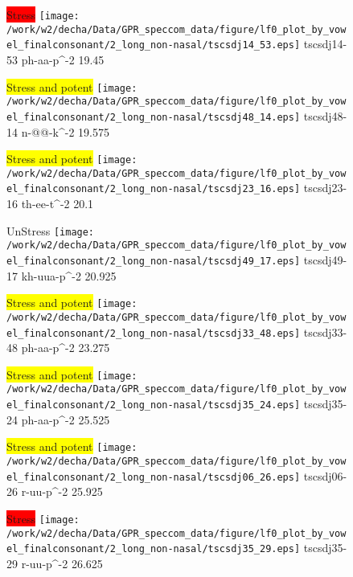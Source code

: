 \documentclass{article}
\begin{document}
\begin{figure}[t]
\begin{minipage}[b]{.24\textwidth}
\colorbox{red}{Stress}
\centering
\texttt{[image: /work/w2/decha/Data/GPR\_speccom\_data/figure/lf0\_plot\_by\_vowel\_finalconsonant/2\_long\_non-nasal/tscsdj14\_53.eps]}
tscsdj14-53 ph-aa-p\textasciicircum-2 19.45
\end{minipage}
\begin{minipage}[b]{.24\textwidth}
\colorbox{yellow}{Stress and potent}
\centering
\texttt{[image: /work/w2/decha/Data/GPR\_speccom\_data/figure/lf0\_plot\_by\_vowel\_finalconsonant/2\_long\_non-nasal/tscsdj48\_14.eps]}
tscsdj48-14 n-@@-k\textasciicircum-2 19.575
\end{minipage}
\begin{minipage}[b]{.24\textwidth}
\colorbox{yellow}{Stress and potent}
\centering
\texttt{[image: /work/w2/decha/Data/GPR\_speccom\_data/figure/lf0\_plot\_by\_vowel\_finalconsonant/2\_long\_non-nasal/tscsdj23\_16.eps]}
tscsdj23-16 th-ee-t\textasciicircum-2 20.1
\end{minipage}
\begin{minipage}[b]{.24\textwidth}
UnStress
\centering
\texttt{[image: /work/w2/decha/Data/GPR\_speccom\_data/figure/lf0\_plot\_by\_vowel\_finalconsonant/2\_long\_non-nasal/tscsdj49\_17.eps]}
tscsdj49-17 kh-uua-p\textasciicircum-2 20.925
\end{minipage}
\end{figure}

\begin{figure}[t]
\begin{minipage}[b]{.24\textwidth}
\colorbox{yellow}{Stress and potent}
\centering
\texttt{[image: /work/w2/decha/Data/GPR\_speccom\_data/figure/lf0\_plot\_by\_vowel\_finalconsonant/2\_long\_non-nasal/tscsdj33\_48.eps]}
tscsdj33-48 ph-aa-p\textasciicircum-2 23.275
\end{minipage}
\begin{minipage}[b]{.24\textwidth}
\colorbox{yellow}{Stress and potent}
\centering
\texttt{[image: /work/w2/decha/Data/GPR\_speccom\_data/figure/lf0\_plot\_by\_vowel\_finalconsonant/2\_long\_non-nasal/tscsdj35\_24.eps]}
tscsdj35-24 ph-aa-p\textasciicircum-2 25.525
\end{minipage}
\begin{minipage}[b]{.24\textwidth}
\colorbox{yellow}{Stress and potent}
\centering
\texttt{[image: /work/w2/decha/Data/GPR\_speccom\_data/figure/lf0\_plot\_by\_vowel\_finalconsonant/2\_long\_non-nasal/tscsdj06\_26.eps]}
tscsdj06-26 r-uu-p\textasciicircum-2 25.925
\end{minipage}
\begin{minipage}[b]{.24\textwidth}
\colorbox{red}{Stress}
\centering
\texttt{[image: /work/w2/decha/Data/GPR\_speccom\_data/figure/lf0\_plot\_by\_vowel\_finalconsonant/2\_long\_non-nasal/tscsdj35\_29.eps]}
tscsdj35-29 r-uu-p\textasciicircum-2 26.625
\end{minipage}
\end{figure}
\end{document}
